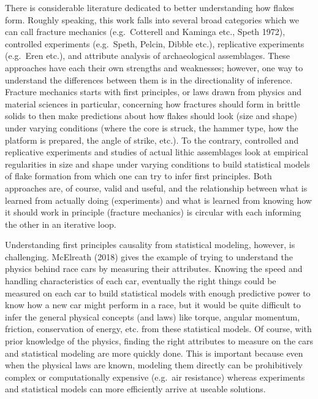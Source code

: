 \documentclass[10pt,letterpaper]{article}
\begin{document}
There is considerable literature dedicated to better understanding how
flakes form. Roughly speaking, this work falls into several broad
categories which we can call fracture mechanics (e.g.~Cotterell and
Kaminga etc., Speth 1972), controlled experiments (e.g.~Speth, Pelcin,
Dibble etc.), replicative experiments (e.g.~Eren etc.), and attribute
analysis of archaeological assemblages. These approaches have each their
own strengths and weaknesses; however, one way to understand the
differences between them is in the directionality of inference. Fracture
mechanics starts with first principles, or laws drawn from physics and
material sciences in particular, concerning how fractures should form in
brittle solids to then make predictions about how flakes should look
(size and shape) under varying conditions (where the core is struck, the
hammer type, how the platform is prepared, the angle of strike, etc.).
To the contrary, controlled and replicative experiments and studies of
actual lithic assemblages look at empirical regularities in size and
shape under varying conditions to build statistical models of flake
formation from which one can try to infer first principles. Both
approaches are, of course, valid and useful, and the relationship
between what is learned from actually doing (experiments) and what is
learned from knowing how it should work in principle (fracture
mechanics) is circular with each informing the other in an iterative
loop.

Understanding first principles causality from statistical modeling,
however, is challenging. McElreath (2018) gives the example of trying to
understand the physics behind race cars by measuring their attributes.
Knowing the speed and handling characteristics of each car, eventually
the right things could be measured on each car to build statistical
models with enough predictive power to know how a new car might perform
in a race, but it would be quite difficult to infer the general physical
concepts (and laws) like torque, angular momentum, friction,
conservation of energy, etc. from these statistical models. Of course,
with prior knowledge of the physics, finding the right attributes to
measure on the cars and statistical modeling are more quickly done. This
is important because even when the physical laws are known, modeling
them directly can be prohibitively complex or computationally expensive
(e.g.~air resistance) whereas experiments and statistical models can
more efficiently arrive at useable solutions.
\end{document}

